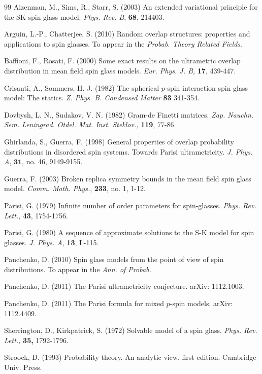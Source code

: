 \documentclass[12pt]{article}
\newenvironment{Proof of lemma}{\noindent{\bf Proof of Lemma}}{\hfill$\Box$\newline}
\newenvironment{Proof of theorem}{\noindent{\bf Proof of Theorem}}{\hfill{\footnotesize${\square}$}\newline}
\newenvironment{Proof of theorems}{\noindent{\bf Proof of Theorems}}{\hfill$\Box$\newline}
\newenvironment{Proof of proposition}{\noindent{\bf Proof of Proposition}}{\hfill$\Box$\newline}
\newenvironment{Proof of propositions}{\noindent{\bf Proof of Propositions}}{\hfill$\Box$\newline}
\newenvironment{Proof of exercise}{\noindent{\it Proof of Exercise:}}{\hfill$\Box$}
\numberwithin{equation}{section}
\begin{document}
\begin{thebibliography}{99}
\footnotesize
{}
Aizenman, M., Sims, R., Starr, S. (2003) An extended variational principle for the SK spin-glass model. {\it Phys. Rev. B}, {\bf 68}, 214403.

Arguin, L.-P., Chatterjee, S. (2010) Random overlap structures: properties and applications to spin glasses. To appear in the {\it Probab. Theory Related Fields}.

Baffioni, F., Rosati, F. (2000) Some exact results on the ultrametric overlap distribution in mean field spin glass models. {\it Eur. Phys. J. B,}
{\bf 17}, 439-447.

Crisanti, A., Sommers, H. J. (1982) The spherical $p$-spin interaction spin glass model: The statics. {\it Z. Phys. B. Condensed Matter} {\bf 83} 
341-354.

Dovbysh, L. N., Sudakov, V. N. (1982) Gram-de Finetti matrices. {\it Zap. Nauchn. Sem. Leningrad. Otdel. Mat. Inst. Steklov.,} {\bf 119}, 77-86.

Ghirlanda, S., Guerra, F. (1998) General properties of overlap probability distributions in disordered spin systems. 
Towards Parisi ultrametricity. {\it J. Phys. A}, $\mathbf{31}$, no. 46, 9149-9155.

Guerra, F. (2003) Broken replica symmetry bounds in the mean field spin glass model. {\it Comm. Math. Phys.}, {\bf 233}, no. 1, 1-12.

Parisi, G. (1979) Infinite number of order parameters for spin-glasses. {\it Phys. Rev. Lett.}, \textbf{43}, 1754-1756.

Parisi, G. (1980) A sequence of approximate solutions to the S-K model for spin glasses. {\it J. Phys. A}, \textbf{13}, L-115.

Panchenko, D. (2010) Spin glass models from the point of view of spin distributions. To appear in the {\it Ann. of Probab.}

Panchenko, D. (2011) The Parisi ultrametricity conjecture. arXiv: 1112.1003.

Panchenko, D. (2011) The Parisi formula for mixed $p$-spin models. arXiv: 1112.4409.

Sherrington, D., Kirkpatrick, S. (1972) Solvable model of a spin glass. {\it Phys. Rev. Lett.,} {\bf 35,} 1792-1796.

Stroock, D. (1993) Probability theory. An analytic view, first edition. Cambridge Univ. Press.



\end{thebibliography}
\end{document}
